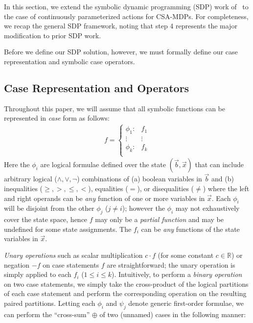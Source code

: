 \documentclass[letterpaper]{article}
\begin{document}
In this section, we extend the symbolic dynamic programming (SDP)
work of~\cite{fomdp,sanner_uai11}
to the case of continuously parameterized actions for CSA-MDPs.  
For completeness, we recap the general SDP framework, noting that 
step 4 represents the major modification to prior SDP work.

Before we define our SDP solution, however, we must formally define our
case representation and symbolic case operators.

\subsection{Case Representation and Operators}

Throughout this paper, we will assume that all symbolic functions
can be represented in \emph{case} form as follows:
{%
\begin{align*}
f = 
\begin{cases}
  \phi_1: & f_1 \\ 
 \vdots&\vdots\\ 
  \phi_k: & f_k \\ 
\end{cases} \label{eq:case}
\end{align*}
}
Here the $\phi_i$ are logical formulae defined over the state
$(\vec{b},\vec{x})$ that can include arbitrary logical ($\land,\lor,\neg$)
combinations of (a) boolean variables in $\vec{b}$ and (b) 
inequalities ($\geq,>,\leq,<$), equalities ($=$), or disequalities ($\neq$)
where the left and right operands can be \emph{any} function of one or more 
variables in $\vec{x}$.  
Each $\phi_i$ will be disjoint from the other $\phi_j$ ($j \neq i$); 
however the $\phi_i$ may not exhaustively cover the state space, hence
$f$ may only be a \emph{partial function} and may be undefined for some
state assignments.
The $f_i$ can be \emph{any} functions of the state
variables in $\vec{x}$.  

\emph{Unary operations} such as scalar multiplication $c\cdot f$ (for
some constant $c \in \mathbb{R}$) or negation $-f$ on case statements
$f$ are straightforward; the unary operation is simply applied to each
$f_i$ ($1 \leq i \leq k$). Intuitively, to perform a \emph{binary
  operation} on two case statements, we simply take the cross-product
of the logical partitions of each case statement and perform the
corresponding operation on the resulting paired partitions.  Letting
each $\phi_i$ and $\psi_j$ denote generic first-order formulae, we can
perform the ``cross-sum'' $\oplus$ of two (unnamed) cases in the
following manner:
\end{document}
